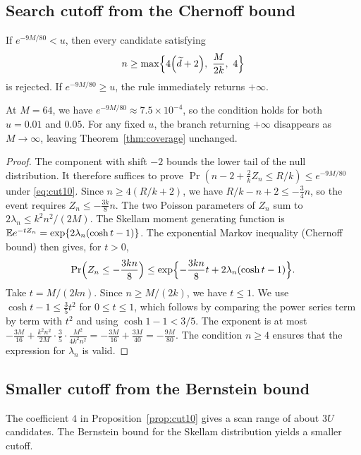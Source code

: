 \subsection{Search cutoff from the Chernoff bound}
\begin{proposition}\label{prop:cut10}
If $e^{-9M/80}<u$, then every candidate satisfying
\begin{equation}
n\ge\max\Bigl\{4\Bigl(\widetilde d+2\Bigr),\ \frac M{2k},\ 4\Bigr\}\label{eq:cut10}
\end{equation}
is rejected. If $e^{-9M/80}\ge u$, the rule immediately returns $+\infty$.
\end{proposition}

At $M=64$, we have $e^{-9M/80}\approx7.5\times10^{-4}$, so the condition holds for both $u=0.01$ and $0.05$. For any fixed $u$, the branch returning $+\infty$ disappears as $M\to\infty$, leaving Theorem~\ref{thm:coverage} unchanged.

\begin{proof}
The component with shift $-2$ bounds the lower tail of the null distribution. It therefore suffices to prove $\Pr(n-2+\frac2kZ_n\le R/k)\le e^{-9M/80}$ under \eqref{eq:cut10}. Since $n\ge4(R/k+2)$, we have $R/k-n+2\le-\frac34n$, so the event requires $Z_n\le-\frac{3k}{8}n$. The two Poisson parameters of $Z_n$ sum to $2\lambda_n\le k^2n^2/(2M)$. The Skellam moment generating function is $\mathbb E e^{-tZ_n}=\exp\{2\lambda_n(\cosh t-1)\}$. The exponential Markov inequality (Chernoff bound) then gives, for $t>0$,
\begin{equation*}
\Pr\Bigl(Z_n\le-\frac{3kn}8\Bigr)\le\exp\Bigl\{-\frac{3kn}8t+2\lambda_n(\cosh t-1)\Bigr\}.
\end{equation*}
Take $t=M/(2kn)$. Since $n\ge M/(2k)$, we have $t\le1$. We use $\cosh t-1\le\frac35t^2$ for $0\le t\le1$, which follows by comparing the power series term by term with $t^2$ and using $\cosh1-1<3/5$. The exponent is at most $-\frac{3M}{16}+\frac{k^2n^2}{2M}\cdot\frac35\cdot\frac{M^2}{4k^2n^2}=-\frac{3M}{16}+\frac{3M}{40}=-\frac{9M}{80}$. The condition $n\ge4$ ensures that the expression for $\lambda_n$ is valid.
\end{proof}

\subsection{Smaller cutoff from the Bernstein bound}
The coefficient $4$ in Proposition~\ref{prop:cut10} gives a scan range of about $3U$ candidates. The Bernstein bound for the Skellam distribution yields a smaller cutoff.

